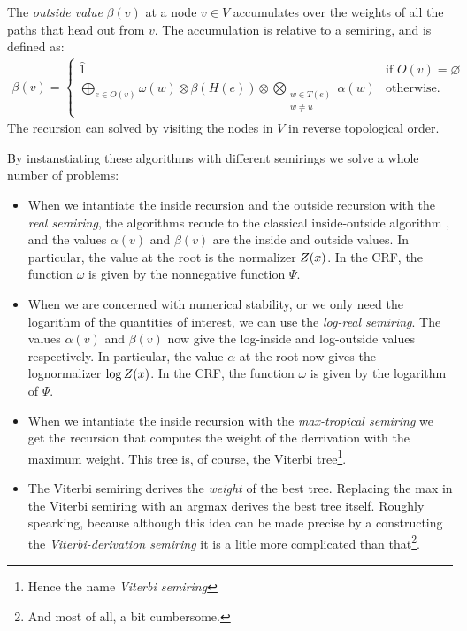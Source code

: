   \begin{definition}{} The \textit{outside value} $\beta(v)$ at a node $v \in V$ accumulates over the weights of all the paths that head out from $v$. The accumulation is relative to a semiring, and is defined as:
  \begin{align*}
    \beta(v) =
      \begin{cases}
        \hat{1}  & \mbox{if } O(v) = \varnothing \\
        \displaystyle\bigoplus_{e \in O(v)} \omega(w) \otimes \beta(H(e)) \otimes \displaystyle\bigotimes_{ \substack{ w \in T(e) \\ w \neq u } } \alpha(w)  & \mbox{otherwise.}
      \end{cases}
  \end{align*}
  The recursion can solved by visiting the nodes in $V$ in reverse topological order.
  \end{definition}


By instanstiating these algorithms with different semirings we solve a whole number of problems:
\begin{itemize}

    \item When we intantiate the inside recursion and the outside recursion with the \textit{real semiring}, the algorithms recude to the classical inside-outside algorithm \citep{baker1979trainable}, and the values $\alpha(v)$ and $\beta(v)$ are the inside and outside values. In particular, the value at the root is the normalizer $Z(x)$. In the CRF, the function $\omega$ is given by the nonnegative function $\Psi$.

    \item When we are concerned with numerical stability, or we only need the logarithm of the quantities of interest, we can use the \textit{log-real semiring}. The values $\alpha(v)$ and $\beta(v)$ now give the log-inside and log-outside values respectively. In particular, the value $\alpha$ at the root now gives the lognormalizer $\log Z(x)$. In the CRF, the function $\omega$ is given by the logarithm of $\Psi$.

    \item When we intantiate the inside recursion with the \textit{max-tropical semiring} we get the recursion that computes the weight of the derrivation with the maximum weight. This tree is, of course, the Viterbi tree\footnote{Hence the name \textit{Viterbi semiring}}.

    \item The Viterbi semiring derives the \textit{weight} of the best tree. Replacing the max in the Viterbi semiring with an argmax derives the best tree itself. Roughly spearking, because although this idea can be made precise by a constructing the \textit{Viterbi-derivation semiring} \citep{goodman1999semiring} it is a litle more complicated than that\footnote{And most of all, a bit cumbersome.}.

\end{itemize}
